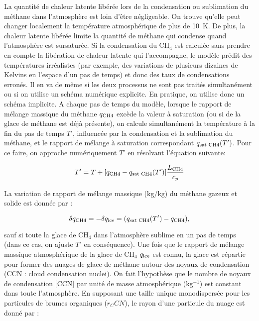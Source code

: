 La quantité de chaleur latente libérée lors de la condensation ou sublimation du méthane dans l’atmosphère est loin d’être négligeable. On trouve qu’elle peut changer localement la température atmosphérique de plus de 10~K. 
De plus, la chaleur latente libérée limite la quantité de méthane qui condense quand l’atmosphère est sursaturée. Si la condensation du CH$_4$ est calculée sans prendre en compte la libération de chaleur latente qui l’accompagne, le modèle prédit des températures irréalistes (par exemple, des variations de plusieurs dizaines de Kelvins en l’espace d’un pas de temps) et donc des taux de condensations erronés. Il en va de même si les deux processus ne sont pas traités simultanément ou si on utilise un schéma numérique explicite. 
En pratique, on utilise donc un schéma implicite. A chaque pas de temps du modèle, lorsque le rapport de mélange massique du méthane $q_{\mbox{\scriptsize CH4}}$ excède la valeur à saturation (ou si de la glace de méthane est déjà présente), on calcule simultanément la température à la fin du pas de temps $T'$, influencée par la condensation et la sublimation du méthane, et le rapport de mélange à saturation correspondant $q_{\mbox{\scriptsize sat CH4}}(T')$. Pour ce faire, on approche numériquement $T'$  en résolvant l’équation suivante:

\begin{equation}
T' = T + [q_{\mbox{\scriptsize CH4}} - q_{\mbox{\scriptsize sat CH4}}(T')]
\frac{L_{\mbox{\scriptsize CH4}}}{c_p} 
\end{equation}

La variation de rapport de mélange massique (kg/kg) du méthane gazeux et solide est donnée par :

\begin{equation}
\delta q_{\mbox{\scriptsize CH4}} = -\delta q_{\mbox{\scriptsize ice}} = (q_{\mbox{\scriptsize
sat CH4}}(T') - q_{\mbox{\scriptsize CH4}}),
\end{equation}

sauf si toute la glace de CH$_4$ dans l’atmosphère sublime en un pas de temps (dans ce cas, on ajuste $T'$ en conséquence).
Une fois que le rapport de mélange massique atmosphérique de la glace de CH$_4$ $q_{\mbox{\scriptsize ice}}$ est connu, la glace est répartie pour former des nuages de glace de méthane autour des noyaux de condensation  (CCN : cloud condensation nuclei).
On fait l’hypothèse que le nombre de noyaux de condensation [CCN] par unité de masse atmosphérique (kg$^{-1}$) est constant dans toute l’atmosphère. En supposant une taille unique monodispersée pour les particules de brumes organiques ($r_CCN$), le rayon d’une particule du nuage est donné par :

